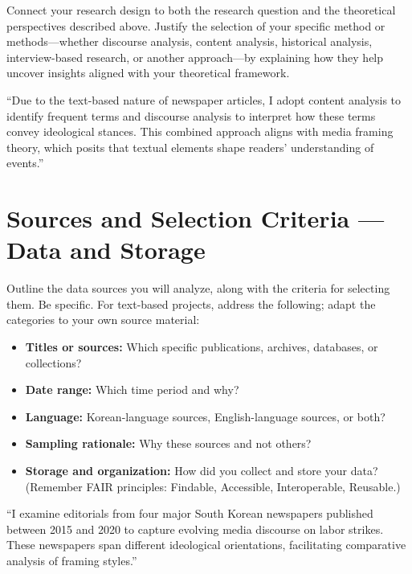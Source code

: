\documentclass[11pt,a4paper]{article}
\begin{document}
Connect your research design to both the research question and the theoretical perspectives described above. Justify the selection of your specific method or methods---whether discourse analysis, content analysis, historical analysis, interview-based research, or another approach---by explaining how they help uncover insights aligned with your theoretical framework.

\begin{examplebox}
``Due to the text-based nature of newspaper articles, I adopt content analysis to identify frequent terms and discourse analysis to interpret how these terms convey ideological stances. This combined approach aligns with media framing theory, which posits that textual elements shape readers' understanding of events.''
\end{examplebox}

\section{Sources and Selection Criteria --- Data and Storage}

Outline the data sources you will analyze, along with the criteria for selecting them. Be specific. For text-based projects, address the following; adapt the categories to your own source material:

\begin{itemize}[nosep]
  \item \textbf{Titles or sources:} Which specific publications, archives, databases, or collections?
  \item \textbf{Date range:} Which time period and why?
  \item \textbf{Language:} Korean-language sources, English-language sources, or both?
  \item \textbf{Sampling rationale:} Why these sources and not others?
  \item \textbf{Storage and organization:} How did you collect and store your data? (Remember FAIR principles: Findable, Accessible, Interoperable, Reusable.)
\end{itemize}

\begin{examplebox}
``I examine editorials from four major South Korean newspapers published between 2015 and 2020 to capture evolving media discourse on labor strikes. These newspapers span different ideological orientations, facilitating comparative analysis of framing styles.''
\end{examplebox}
\end{document}
